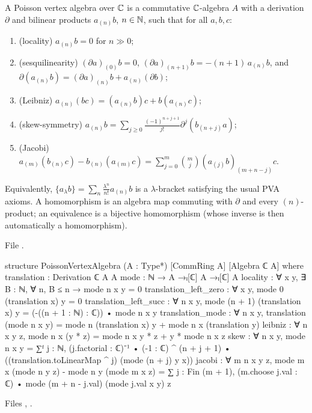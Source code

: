 \begin{definition}\label{l20:def:pva}
A Poisson vertex algebra over ${\mathbb{C}}$ is a commutative ${\mathbb{C}}$-algebra $A$ with a derivation $\partial$ and bilinear
products $a_{(n)}b$, $n\in{\mathbb{N}}$, such that for all $a,b,c$:
\begin{enumerate}
\item (locality) $a_{(n)}b=0$ for $n\gg0$;
\item (sesquilinearity) $(\partial a)_{(0)}b=0$, $(\partial a)_{(n+1)}b=-(n+1)\,a_{(n)}b$, and
  $\partial(a_{(n)}b)=(\partial a)_{(n)}b+a_{(n)}(\partial b)$;
\item (Leibniz) $a_{(n)}(bc)=(a_{(n)}b)c+b(a_{(n)}c)$;
\item (skew-symmetry) $a_{(n)}b=\sum_{j\ge0}\frac{(-1)^{n+j+1}}{j!}\partial^j(b_{(n+j)}a)$;
\item (Jacobi) $a_{(m)}(b_{(n)}c)-b_{(n)}(a_{(m)}c)=\sum_{j=0}^m\binom mj(a_{(j)}b)_{(m+n-j)}c$.
\end{enumerate}
Equivalently, $\{a_\lambda b\}=\sum_n\frac{\lambda^n}{n!}a_{(n)}b$ is a $\lambda$-bracket satisfying the usual
PVA axioms. A homomorphism is an algebra map commuting with $\partial$ and every $(n)$-product; an
equivalence is a bijective homomorphism (whose inverse is then automatically a homomorphism).
\end{definition}
\noindent File .
\begin{leancode}
structure PoissonVertexAlgebra (A : Type*) [CommRing A] [Algebra ℂ A] where
  translation : Derivation ℂ A A
  mode : ℕ → A →ₗ[ℂ] A →ₗ[ℂ] A
  locality : ∀ x y, ∃ B : ℕ, ∀ n, B ≤ n → mode n x y = 0
  translation_left_zero : ∀ x y, mode 0 (translation x) y = 0
  translation_left_succ : ∀ n x y,
    mode (n + 1) (translation x) y = (-((n + 1 : ℕ) : ℂ)) • mode n x y
  translation_mode : ∀ n x y,
    translation (mode n x y) = mode n (translation x) y + mode n x (translation y)
  leibniz : ∀ n x y z, mode n x (y * z) = mode n x y * z + y * mode n x z
  skew : ∀ n x y, mode n x y = ∑ᶠ j : ℕ,
    (j.factorial : ℂ)⁻¹ • (-1 : ℂ) ^ (n + j + 1) •
      ((translation.toLinearMap ^ j) (mode (n + j) y x))
  jacobi : ∀ m n x y z,
    mode m x (mode n y z) - mode n y (mode m x z) =
      ∑ j : Fin (m + 1), (m.choose j.val : ℂ) • mode (m + n - j.val) (mode j.val x y) z
\end{leancode}
\noindent Files ,
.

